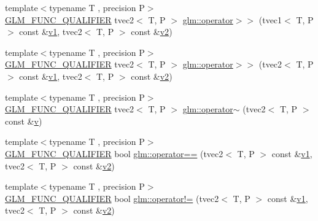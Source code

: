 \begin{DoxyCompactItemize}
\item 
{\footnotesize template$<$typename T , precision P$>$ }\\\mbox{\hyperlink{setup_8hpp_a33fdea6f91c5f834105f7415e2a64407}{G\+L\+M\+\_\+\+F\+U\+N\+C\+\_\+\+Q\+U\+A\+L\+I\+F\+I\+ER}} tvec2$<$ T, P $>$ \mbox{\hyperlink{namespaceglm_a2194c7b6d14ed030ceb4f250575cd443}{glm\+::operator$>$$>$}} (tvec1$<$ T, P $>$ const \&\mbox{\hyperlink{glad_8h_a0779c3b73f9aa3a0ac5b0139b5d291d9}{v1}}, tvec2$<$ T, P $>$ const \&\mbox{\hyperlink{glad_8h_a9a09a1837922b2b806f4589096a52049}{v2}})
\item 
{\footnotesize template$<$typename T , precision P$>$ }\\\mbox{\hyperlink{setup_8hpp_a33fdea6f91c5f834105f7415e2a64407}{G\+L\+M\+\_\+\+F\+U\+N\+C\+\_\+\+Q\+U\+A\+L\+I\+F\+I\+ER}} tvec2$<$ T, P $>$ \mbox{\hyperlink{namespaceglm_a5186df5ddc681c28e70a97652a915e97}{glm\+::operator$>$$>$}} (tvec2$<$ T, P $>$ const \&\mbox{\hyperlink{glad_8h_a0779c3b73f9aa3a0ac5b0139b5d291d9}{v1}}, tvec2$<$ T, P $>$ const \&\mbox{\hyperlink{glad_8h_a9a09a1837922b2b806f4589096a52049}{v2}})
\item 
{\footnotesize template$<$typename T , precision P$>$ }\\\mbox{\hyperlink{setup_8hpp_a33fdea6f91c5f834105f7415e2a64407}{G\+L\+M\+\_\+\+F\+U\+N\+C\+\_\+\+Q\+U\+A\+L\+I\+F\+I\+ER}} tvec2$<$ T, P $>$ \mbox{\hyperlink{namespaceglm_a62bc42668e20066bf02dc38ea43c6e26}{glm\+::operator$\sim$}} (tvec2$<$ T, P $>$ const \&\mbox{\hyperlink{glad_8h_a14cfbe2fc2234f5504618905b69d1e06}{v}})
\item 
{\footnotesize template$<$typename T , precision P$>$ }\\\mbox{\hyperlink{setup_8hpp_a33fdea6f91c5f834105f7415e2a64407}{G\+L\+M\+\_\+\+F\+U\+N\+C\+\_\+\+Q\+U\+A\+L\+I\+F\+I\+ER}} bool \mbox{\hyperlink{namespaceglm_a9254fdee63d0aa9a071cac8f958beec4}{glm\+::operator==}} (tvec2$<$ T, P $>$ const \&\mbox{\hyperlink{glad_8h_a0779c3b73f9aa3a0ac5b0139b5d291d9}{v1}}, tvec2$<$ T, P $>$ const \&\mbox{\hyperlink{glad_8h_a9a09a1837922b2b806f4589096a52049}{v2}})
\item 
{\footnotesize template$<$typename T , precision P$>$ }\\\mbox{\hyperlink{setup_8hpp_a33fdea6f91c5f834105f7415e2a64407}{G\+L\+M\+\_\+\+F\+U\+N\+C\+\_\+\+Q\+U\+A\+L\+I\+F\+I\+ER}} bool \mbox{\hyperlink{namespaceglm_adbb830f9b4c003211b08e6360bceb60b}{glm\+::operator!=}} (tvec2$<$ T, P $>$ const \&\mbox{\hyperlink{glad_8h_a0779c3b73f9aa3a0ac5b0139b5d291d9}{v1}}, tvec2$<$ T, P $>$ const \&\mbox{\hyperlink{glad_8h_a9a09a1837922b2b806f4589096a52049}{v2}})

\end{DoxyCompactItemize}
